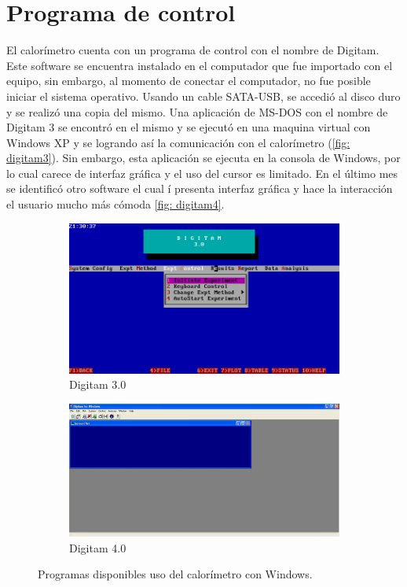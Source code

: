 	\section{Programa de control}
	El calorímetro cuenta con un programa de control con el nombre de Digitam. Este software se encuentra instalado en el computador que fue importado con el equipo, sin embargo, al momento de conectar el computador, no fue posible iniciar el sistema operativo. Usando un cable SATA-USB, se accedió al disco duro y se realizó una copia del mismo. Una aplicación de MS-DOS con el nombre de Digitam 3 se encontró en el mismo y se ejecutó en una maquina virtual con Windows XP y se logrando as\'i la comunicación con el calorímetro (\autoref{fig: digitam3}). Sin embargo, esta aplicaci\'on se ejecuta en la consola de Windows, por lo cual carece de interfaz gr\'afica y el uso del cursor es limitado. En el \'ultimo mes se identific\'o otro software el cual \'i presenta interfaz gr\'afica y hace la interacci\'on el usuario mucho m\'as c\'omoda \autoref{fig: digitam4}.
	\begin{figure}[h]
		\centering
		\begin{subfigure}{0.45\linewidth}
			\includegraphics[width=\linewidth]{Figures/digitam}
			\caption{Digitam 3.0}
			\label{fig: digitam3}
		\end{subfigure}
		\begin{subfigure}{0.54\linewidth}
			\includegraphics[width=\linewidth]{Figures/digitamView}
			\caption{Digitam 4.0}
			\label{fig: digitam4}
		\end{subfigure}
		\caption{Programas disponibles uso del calor\'imetro con Windows.}
	\end{figure}
	
